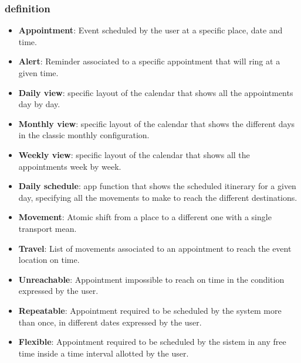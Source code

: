 \subsubsection{definition}
\begin{itemize}
	\item \textbf{Appointment}: Event scheduled by the user at a specific place, date and time.
	\item \textbf{Alert}: Reminder associated to a specific appointment that will ring at a given time.
	\item \textbf{Daily view}:   specific layout of the calendar that shows all the appointments day by day. 
	\item \textbf{Monthly view}: specific layout of the calendar that shows the different days in the classic monthly configuration.
	\item \textbf{Weekly view}: specific layout of the calendar that shows all the appointments week by week. 
	\item \textbf{Daily schedule}: app function that shows the scheduled itinerary for a given day, specifying all the movements to make to reach the different destinations.
	\item \textbf{Movement}: Atomic shift from a place to a different one with a single transport mean.
	\item \textbf{Travel}: List of movements associated to an appointment to reach the event location on time.
	\item \textbf{Unreachable}: Appointment impossible to reach on time in the condition expressed by the user.
	\item \textbf{Repeatable}: Appointment required to be scheduled by the system more than once, in different dates expressed by the user.
	\item \textbf{Flexible}: Appointment required to be scheduled by the sistem in any free time inside a time interval allotted by the user.
\end{itemize}
